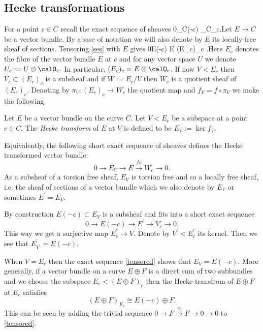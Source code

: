 \subsection{ Hecke transformations}
\label{heckeverystable}

For a point $c\in C$ recall the exact sequence of sheaves \beq \label{ses}0\to \calO_C(-c) \calO_C\to \calO_c.\eeq  Let $E\to C$ be a vector bundle. By abuse of notation we will also denote by $E$ its locally-free sheaf of sections.   Tensoring \eqref{ses} with $E$ gives \beq\label{tensored} 0\to E(-c){\to} E (E_c)_c .\eeq Here $E_c$ denotes the fibre of the vector bundle $E$ at $c$ and for any vector space $U$ we denote $U_c:=U\otimes \calO_c.$ In particular, $(E_c)_c=E\otimes \calO_c$. If now $V<E_c$ then $V_c\subset (E_c)_c$ is a subsheaf and if $W:=E_c/V$ then $W_c$ is a quotient sheaf of $(E_c)_c$. Denoting by  $\pi_V:(E_c)_c\to W_c$ the quotient map and  $f_V=f \circ \pi_V$  we make the following
\begin{definition}
\notready Let $E$ be a vector bundle on the curve $C$.  Let $V<E_c$ be a subspace at a point $c\in C$. The {\em Hecke transform} of $E$ at $V$ is defined to be $E_V:=\ker f_V$. \end{definition} Equivalently, the following   short exact sequence of sheaves defines the Hecke transformed vector bundle: $$0\to E_V{\to} E\stackrel{f_V}{\to} W_c \to 0.$$ As a subsheaf of a torsion free sheaf, $E_V$ is torsion free and so a locally free sheaf, i.e. the sheaf of sections of a vector bundle which we also denote by $E_V$ or sometimes $E^\prime=E_V$.

\begin{remark}
\notready \label{remarkV}By construction $E(-c)\subset E_V$ is a subsheaf and fits into a short exact sequence $$0\to E(-c){\to} E^\prime{\to} V_c \to 0.$$ This way we get a surjective map $E^\prime_c\to V$. Denote by $V^\prime < E^\prime_c$ its kernel.
	Then we see that $E^\prime_{V^\prime}=E(-c)$.
\end{remark}

\begin{example}
\notready\label{heckebundle} When $V=E_c$ then the exact sequence \eqref{tensored} shows that $E_V=E(-c)$. More generally, if a vector bundle on a curve $E\oplus F$ is a direct sum of two subbundles  and we  choose the subspace $E_c<(E\oplus F)_c$ then the Hecke transfrom of $E\oplus F$ at $E_c$ satisfies $$(E\oplus F)_{E_c}\cong E(-c)
\oplus F.$$ This can be seen by adding the trivial sequence $0\rightarrow F\stackrel{\cong}{\rightarrow}F\to 0 \to 0$ to \eqref{tensored}.	\end{example}

